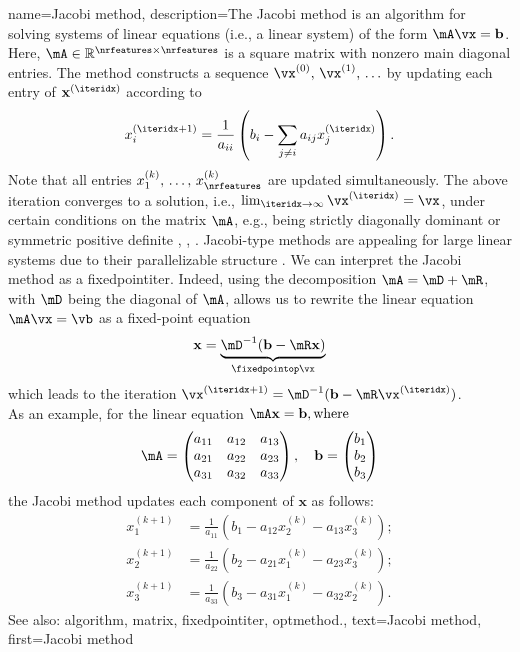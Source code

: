 {name={Jacobi method},
	description={The Jacobi method is an \gls{algorithm}  
		for solving systems of linear equations (i.e., a linear system) of the form $\mA\vx= \mathbf{b}$.  
		Here, $\mA \in \mathbb{R}^{\nrfeatures \times \nrfeatures}$ is a square \gls{matrix} with 
		nonzero main diagonal entries. The method constructs a sequence $\vx^{(0)}, \,\vx^{(1)}, \,\ldots$ 
		by updating each entry of $\mathbf{x}^{(\iteridx)}$ according to 
		\[
		x_i^{(\iteridx+1)} = \frac{1}{a_{ii}} \left( b_i - \sum_{j \neq i} a_{ij} x_j^{(\iteridx)} \right).
		\]
		Note that all entries $x^{(k)}_{1}, \,\ldots, \,x^{(k)}_{\nrfeatures}$ are updated simultaneously.
		The above iteration converges to a solution, i.e., $\lim_{\iteridx \rightarrow \infty} \vx^{(\iteridx)}=\vx$, 
		under certain conditions on the \gls{matrix} $\mA$, e.g., being strictly 
		diagonally dominant or symmetric positive  definite \cite{GolubVanLoanBook}, \cite{StrangLinAlg2016}, \cite{Horn91}. 
		Jacobi-type methods are appealing for large linear systems due to their parallelizable structure \cite{ParallelDistrBook}.
		We can interpret the Jacobi method as a \gls{fixedpointiter}. Indeed, using the decomposition $\mA = \mD + \mR$, with $\mD$ being the 
		diagonal of $\mA$, allows us to rewrite the linear equation $\mA \vx = \vb$ as a fixed-point equation  
		\[
		\mathbf{x} = \underbrace{\mD^{-1}(\mathbf{b} - \mR \mathbf{x})}_{\fixedpointop \vx}
		\]
		which leads to the iteration $\vx^{(\iteridx+1)} = \mD^{-1}(\mathbf{b} - \mR \vx^{(\iteridx)})$.
		\\
		As an example, for the linear equation $\mA \mathbf{x} = \mathbf{b}, \text{where}$
		 \[
		 \mA = \begin{pmatrix}
		 	a_{11} & a_{12} & a_{13} \\
		 	a_{21} & a_{22} & a_{23} \\
		 	a_{31} & a_{32} & a_{33}
		 \end{pmatrix}, \quad
		 \mathbf{b} = \begin{pmatrix}
		 	b_1 \\
		 	b_2 \\
		 	b_3
		 \end{pmatrix}
		 \]
		 the Jacobi method updates each component of \( \mathbf{x} \) as follows:
		 \[
		 \begin{aligned}
		 	x_1^{(k+1)} &= \frac{1}{a_{11}} \left( b_1 - a_{12} x_2^{(k)} - a_{13} x_3^{(k)} \right); \\
		 	x_2^{(k+1)} &= \frac{1}{a_{22}} \left( b_2 - a_{21} x_1^{(k)} - a_{23} x_3^{(k)} \right); \\
		 	x_3^{(k+1)} &= \frac{1}{a_{33}} \left( b_3 - a_{31} x_1^{(k)} - a_{32} x_2^{(k)} \right).
		 \end{aligned}
		 \]
		See also: \gls{algorithm}, \gls{matrix}, \gls{fixedpointiter}, \gls{optmethod}.},
	text={Jacobi method}, 
	first={Jacobi method}
}
	
